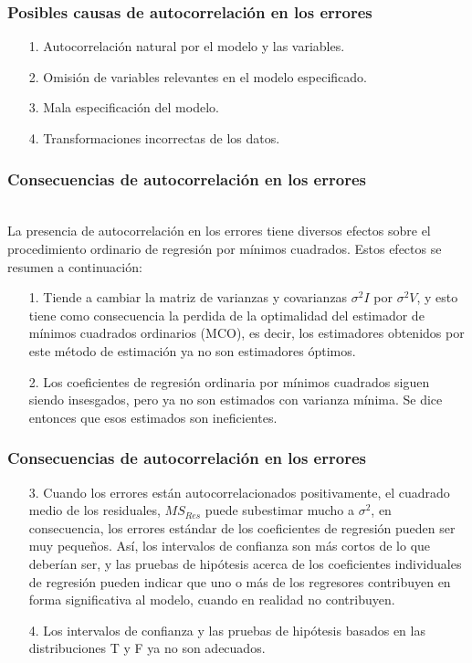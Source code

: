 \documentclass[12pt]{beamer}
\begin{document}
\begin{frame}
\frametitle{Posibles causas de autocorrelación en los errores}
\begin{itemize}
\item[1.]Autocorrelación natural por el modelo y las variables.
\item[2.]Omisión de variables relevantes en el modelo especificado.
\item[3.]Mala especificación del modelo. 
\item[4.]Transformaciones incorrectas de los datos.
\end{itemize}
\end{frame}

\begin{frame}
\frametitle{Consecuencias de autocorrelación en los errores}
~\\La presencia de autocorrelación en los errores tiene diversos efectos sobre el procedimiento ordinario de regresión por mínimos cuadrados. Estos efectos se resumen a continuación:
\begin{itemize}
\item[1.]Tiende a cambiar la matriz de varianzas y covarianzas $\sigma^2 I$ por $\sigma^2 V$, y esto tiene como consecuencia la perdida de la optimalidad del estimador de mínimos cuadrados ordinarios (MCO), es decir, los estimadores obtenidos por este método de estimación ya no son estimadores óptimos.
\item[2.]Los coeficientes de regresión ordinaria por mínimos cuadrados siguen siendo insesgados, pero ya no son estimados con varianza mínima. Se dice entonces que esos estimados son ineficientes.
\end{itemize}
\end{frame}

\begin{frame}
\frametitle{Consecuencias de autocorrelación en los errores}
\begin{itemize}
\item[3.]Cuando los errores están autocorrelacionados positivamente, el cuadrado medio de los residuales, $MS_{Res}$ puede subestimar mucho a $\sigma^2$, en consecuencia, los errores estándar de los coeficientes de regresión pueden ser muy pequeños. Así, los intervalos de confianza son más cortos de lo que deberían ser, y las pruebas de hipótesis acerca de los coeficientes individuales de regresión pueden indicar que uno o más de los regresores contribuyen en forma significativa al modelo, cuando en realidad no contribuyen. 
\item[4.]Los intervalos de confianza y las pruebas de hipótesis basados en las distribuciones T y F ya no son adecuados.
\end{itemize}
\end{frame}
\end{document}
